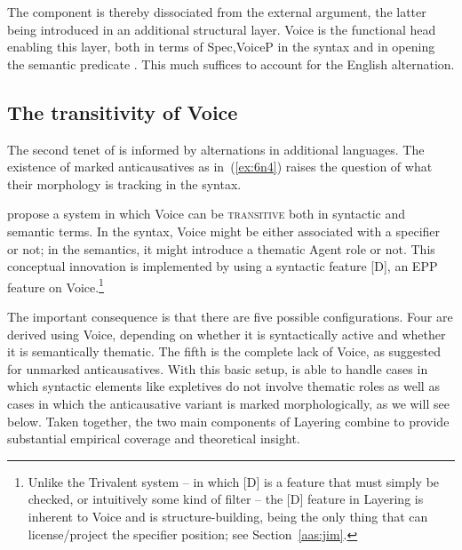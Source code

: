 \begin{exe}
\begin{xlist}
\begin{exe}
\begin{exe}
\begin{xlist}
The  component is thereby dissociated from the external argument, the latter being introduced in an additional structural layer. Voice is the functional head enabling this layer, both in terms of  Spec,VoiceP in the syntax and in opening the semantic predicate . This much suffices to account for the English alternation.

	\subsection{The transitivity of Voice} \label{aas:layering:features}
The second tenet of  is informed by alternations in additional languages. The existence of marked anticausatives as in~(\ref{ex:6n4}) raises the question of what their morphology is tracking in the syntax.
 \begin{exe}
	
 \z 

\cite{layering15} propose a system in which Voice can be \textsc{transitive} both in syntactic and semantic terms. In the syntax, Voice might be either associated with a specifier or not; in the semantics, it might introduce a thematic Agent role or not. This conceptual innovation is implemented by using a syntactic feature [D], an EPP feature on Voice.\footnote{Unlike the Trivalent system -- in which [D] is a feature that must simply be checked, or intuitively some kind of filter -- the [D] feature in Layering is inherent to Voice and is structure-building, being the only thing that can license/project the specifier position; see Section~\ref{aas:jim}.}

The important consequence is that there are five possible configurations. Four are derived using Voice, depending on whether it is syntactically active and whether it is semantically thematic. The fifth is the complete lack of Voice, as suggested for unmarked anticausatives. With this basic setup,  is able to handle cases in which syntactic elements like expletives do not involve thematic roles as well as cases in which the anticausative variant is marked morphologically, as we will see below. Taken together, the two main components of Layering combine to provide substantial empirical coverage and theoretical insight.


\end{exe}
\end{xlist}
\end{exe}
\end{exe}
\end{xlist}
\end{exe}
